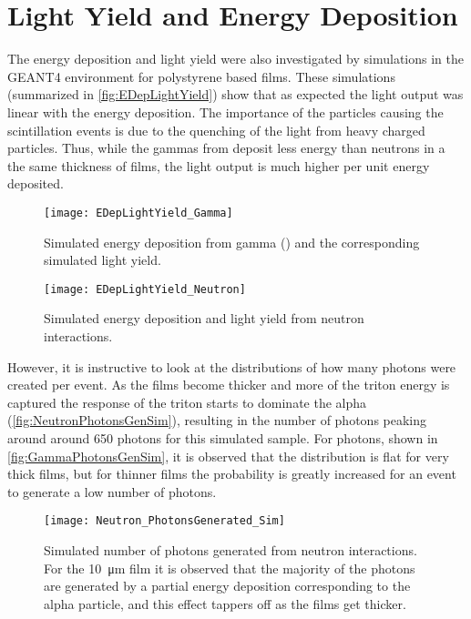 \section{Light Yield and Energy Deposition}
The energy deposition and light yield were also investigated by simulations in the GEANT4 environment for polystyrene based films.
These simulations (summarized in \autoref{fig:EDepLightYield}) show that as expected the light output was linear with the energy deposition.
The importance of the particles causing the scintillation events is due to the quenching of the light from heavy charged particles.
Thus, while the gammas from  deposit  less energy than neutrons in a the same thickness of films, the light output is much higher per unit energy deposited.
\begin{figure}
 	\centering
  	\texttt{[image: EDepLightYield\_Gamma]}
		\caption[Energy Deposition and Light Yield in Polystyene from Co-60 Photons]{Simulated energy deposition from gamma () and the corresponding simulated light yield. \SimEDeLYGeo}
\end{figure}
\begin{figure}
 	\centering
  	\texttt{[image: EDepLightYield\_Neutron]}
  	\caption[Energy Deposition and Light Yield in Polystyene from Neutrons]{Simulated energy deposition and light yield from neutron interactions.  \SimEDeLYGeo}
  \label{fig:EDepLightYield}
\end{figure}
However, it is instructive to look at the distributions of how many photons were created per event.
As the films become thicker and more of the triton energy is captured the response of the triton starts to dominate the alpha (\autoref{fig:NeutronPhotonsGenSim}), resulting in the number of photons peaking around around 650 photons for this simulated sample.
For photons, shown in \autoref{fig:GammaPhotonsGenSim}, it is observed that the distribution is flat for very thick films, but for thinner films the probability is greatly increased for an event to generate a low number of photons.
\begin{figure}
  \centering
  \texttt{[image: Neutron\_PhotonsGenerated\_Sim]}
  \caption[Number of photons generated from neutron interactions]{Simulated number of photons generated from neutron interactions.  For the \SI{10}{\um} film it is observed that the majority of the photons are generated by a partial energy deposition corresponding to the alpha particle, and this effect tappers off as the films get thicker. \SimEDeLYGeo}
  \label{fig:NeutronPhotonsGenSim}
\end{figure}
